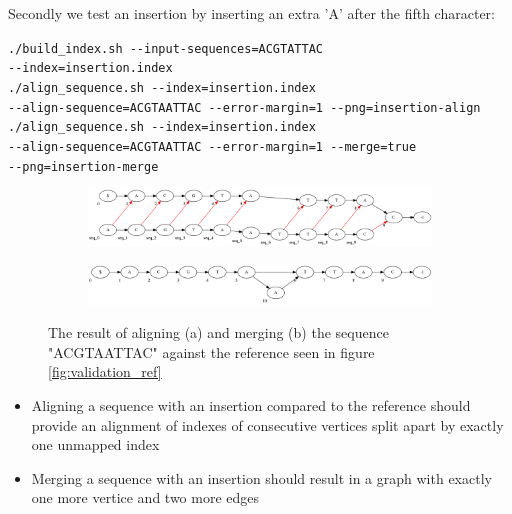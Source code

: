 \documentclass[thesis.tex]{subfiles}
\begin{document}
Secondly we test an insertion by inserting an extra 'A' after the fifth character:\\
\par\noindent
\texttt{./build\_index.sh -{}-input-sequences=ACGTATTAC \\
-{}-index=insertion.index}\\
\texttt{./align\_sequence.sh -{}-index=insertion.index \\
-{}-align-sequence=ACGTAATTAC -{}-error-margin=1 -{}-png=insertion-align}\\
\texttt{./align\_sequence.sh -{}-index=insertion.index \\
-{}-align-sequence=ACGTAATTAC -{}-error-margin=1 -{}-merge=true \\
-{}-png=insertion-merge}\\
\begin{figure}[!h]
  \begin{mdframed}
  \begin{subfigure}[t]{\textwidth}
      \includegraphics[width=\textwidth]{output/insertion-align.png}
    \subcaption{}
  \end{subfigure}
  \begin{subfigure}[t]{\textwidth}
      \includegraphics[width=\textwidth]{output/insertion-merge.png}
    \subcaption{}
  \end{subfigure} 
\end{mdframed}
  \caption{The result of aligning (a) and merging (b) the sequence "ACGTAATTAC" against the reference seen in figure \ref{fig:validation_ref}}
  \label{fig:validation_insertion}
\end{figure}
\begin{itemize}
\item Aligning a sequence with an insertion compared to the reference should provide an alignment of indexes of consecutive vertices split apart by exactly one unmapped index
\item Merging a sequence with an insertion should result in a graph with exactly one more vertice and two more edges
\end{itemize}
\end{document}
